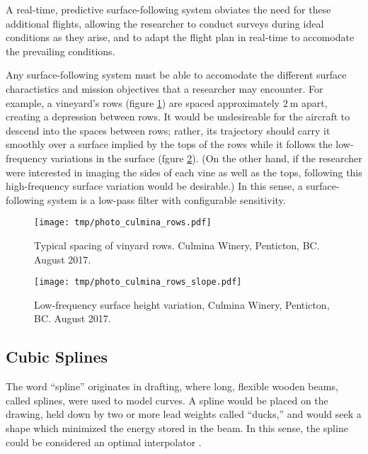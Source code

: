 \documentclass[doc]{apa6}
\begin{document}
A real-time, predictive surface-following system obviates the need for these additional flights, allowing the researcher to conduct surveys during ideal conditions as they arise, and to adapt the flight plan in real-time to accomodate the prevailing conditions.

Any surface-following system must be able to accomodate the different surface charactistics and mission objectives that a researcher may encounter. For example, a vineyard's rows (figure \ref{fig:photo_culmina_rows}) are spaced approximately $\SI{2}\m$ apart, creating a depression between rows. It would be undesireable for the aircraft to descend into the spaces between rows; rather, its trajectory should carry it smoothly over a surface implied by the tops of the rows while it follows the low-frequency variations in the surface (fgure \ref{fig:photo_culmina_rows_slope}). (On the other hand, if the researcher were interested in imaging the sides of each vine as well as the tops, following this high-frequency surface variation would be desirable.) In this sense, a surface-following system is a low-pass filter with configurable sensitivity. 

\begin{figure} %
\texttt{[image: tmp/photo\_culmina\_rows.pdf]} 
\caption{Typical spacing of vinyard rows. Culmina Winery, Penticton, BC. August 2017.}
\label{fig:photo_culmina_rows}
\end{figure}

\begin{figure} %
\texttt{[image: tmp/photo\_culmina\_rows\_slope.pdf]} 
\caption{Low-frequency surface height variation, Culmina Winery, Penticton, BC. August 2017.}
\label{fig:photo_culmina_rows_slope}
\end{figure}

\subsection{Cubic Splines}

The word ``spline'' originates in drafting, where long, flexible wooden beams, called splines, were used to model curves. A spline would be placed on the drawing, held down by two or more lead weights called ``ducks,'' and would seek a shape which minimized the energy stored in the beam. In this sense, the spline could be considered an optimal interpolator \parencite{Wegman2016}. 
\end{document}

